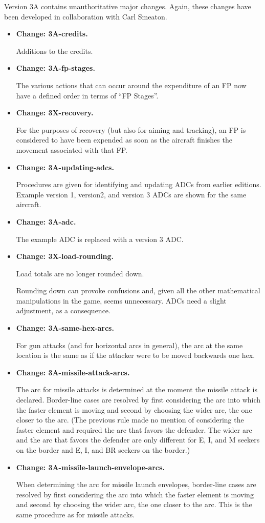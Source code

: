 \documentclass[10pt]{report}
\newcommand{\itemtag}[1]{\item \textbf{Change: #1.}\par}
\begin{document}
Version 3A contains unauthoritative major changes. Again, these changes have been developed in collaboration with Carl Smeaton.

\begin{itemize}
    \itemtag{3A-credits} Additions to the credits.
    
    \itemtag{3A-fp-stages} The various actions that can occur around the expenditure of an FP now have a defined order in terms of “FP Stages”.
    
    \itemtag{3X-recovery} For the purposes of recovery (but also for aiming and tracking), an FP is considered to have been expended as soon as the aircraft finishes the movement associated with that FP.
    
    \itemtag{3A-updating-adcs} Procedures are given for identifying and updating ADCs from earlier editions. Example version 1, version2, and version 3 ADCs are shown for the same aircraft.
    
    \itemtag{3A-adc} The example ADC is replaced with a version 3 ADC.
    
    \itemtag{3X-load-rounding} Load totals are no longer rounded down.
    
    Rounding down can provoke confusions and, given all the other mathematical manipulations in the game, seems unnecessary. ADCs need a slight adjustment, as a consequence.
    
    \itemtag{3A-same-hex-arcs} For gun attacks (and for horizontal arcs in general), the arc at the same location is the same as if the attacker were to be moved backwards one hex.
    
    \itemtag{3A-missile-attack-arcs} The arc for missile attacks is determined at the moment the missile attack is declared. Border-line cases are resolved by first considering the arc into which the faster element is moving and second by choosing the wider arc, the one closer to the  arc. (The previous rule made no mention of considering the faster element and required the arc that favors the defender. The wider arc and the arc that favors the defender are only different for E, I, and M seekers on the  border and E, I, and BR seekers on the  border.)

    \itemtag{3A-missile-launch-envelope-arcs} When determining the arc for missile launch envelopes, border-line cases are resolved by first considering the arc into which the faster element is moving and second by choosing the wider arc, the one closer to the  arc. This is the same procedure as for missile attacks.    


\end{itemize}
\end{document}
